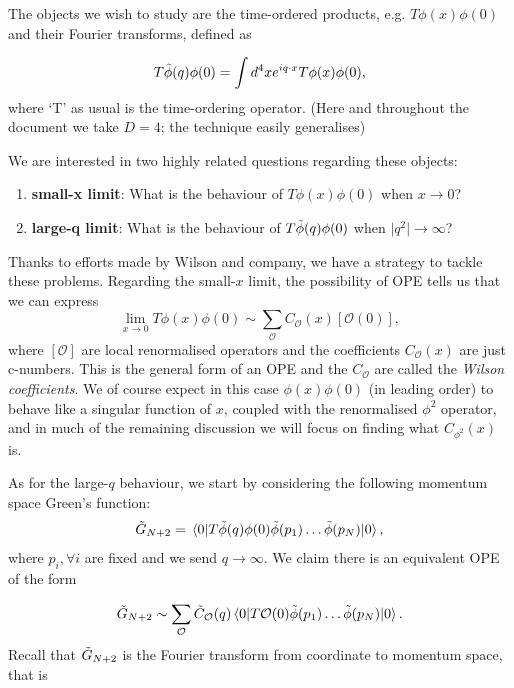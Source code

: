 \documentclass{article}
\begin{document}
The objects we wish to study are the time-ordered products, e.g. $T\phi(x)\phi(0)$ and their Fourier transforms, defined as

\begin{equation}
    T\Tilde{\phi}(q)\phi(0) = \int d^4x e^{iq\cdot x} T\phi(x)\phi(0),
\end{equation}
where `T' as usual is the time-ordering operator. (Here and throughout the document we take $D=4$; the technique easily generalises)

We are interested in two highly related questions regarding these objects:

\begin{enumerate}
    \item \textbf{small-x limit}: What is the behaviour of $T\phi(x)\phi(0)$ when $x\rightarrow 0$? 
    \item \textbf{large-q limit}: What is the behaviour of $T\Tilde{\phi}(q)\phi(0)$ when $\vert q^2\vert \rightarrow\infty$?
\end{enumerate}

Thanks to efforts made by Wilson \cite{wilson} and company, we have a strategy to tackle these problems. Regarding the small-$x$ limit, the possibility of OPE tells us that we can express 
 \begin{equation}
     \lim_{x\rightarrow 0}T\phi(x)\phi(0) \sim \sum_\mathcal{O} C_\mathcal{O}(x)[\mathcal{O}(0)],
     \label{small x ope}
 \end{equation}
 where $[\mathcal{O}]$ are local renormalised operators and the coefficients $C_\mathcal{O}(x)$ are just c-numbers.  This is the general form of an OPE and the $C_\mathcal{O}$ are called the \textit{Wilson coefficients}. We of course expect in this case $\phi(x)\phi(0)$ (in leading order) to behave like a singular function of $x$, coupled with the renormalised $\phi^2$ operator, and in much of the remaining discussion we will focus on finding what $C_{\phi^2}(x)$ is.

 
 As for the large-$q$ behaviour, we start by considering the following momentum space Green's function:
 \begin{equation}
     \Tilde{G}_{N+2} = \mel{0}{T\Tilde{\phi}(q)\phi(0)\Tilde{\phi}(p_1)\dots\Tilde{\phi}(p_N)}{0},
 \end{equation}
 where $p_i,\forall i$ are fixed and we send $q\rightarrow \infty$. We claim there is an equivalent OPE of the form
 
 \begin{equation}
     \Tilde{G}_{N+2} \sim \sum_\mathcal{O} \Tilde{C}_\mathcal{O}(q) \mel{0}{T\mathcal{O}(0)\Tilde{\phi}(p_1)\dots\Tilde{\phi}(p_N)}{0}.
     \label{large q ope}
 \end{equation}
 Recall that $\Tilde{G}_{N+2}$ is the Fourier transform from coordinate to momentum space, that is
 
\end{document}
